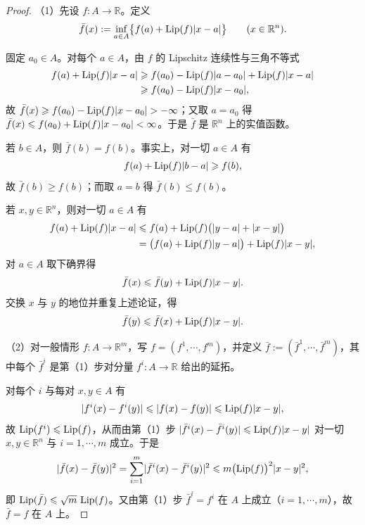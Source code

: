 \documentclass[../../main.tex]{subfiles}%
\begin{document}
\begin{proof}
（1）先设 $f:A\to\mathbb{R}$。定义
\begin{align*}
\bar f(x):=\inf_{a\in A}\bigl\{f(a)+\operatorname{Lip}(f)\lvert x-a\rvert\bigr\}\qquad(x\in\mathbb{R}^n).
\end{align*}

固定 $a_0\in A$。对每个 $a\in A$，由 $f$ 的 Lipschitz 连续性与三角不等式
\begin{align*}
f(a)+\operatorname{Lip}(f)\lvert x-a\rvert
&\geqslant f(a_0)-\operatorname{Lip}(f)\lvert a-a_0\rvert+\operatorname{Lip}(f)\lvert x-a\rvert\\
&\geqslant f(a_0)-\operatorname{Lip}(f)\lvert x-a_0\rvert,
\end{align*}
故 $\bar f(x)\geqslant f(a_0)-\operatorname{Lip}(f)\lvert x-a_0\rvert>-\infty$；又取 $a=a_0$ 得 $\bar f(x)\leqslant f(a_0)+\operatorname{Lip}(f)\lvert x-a_0\rvert<\infty$。于是 $\bar f$ 是 $\mathbb{R}^n$ 上的实值函数。

若 $b\in A$，则 $\bar f(b)=f(b)$。事实上，对一切 $a\in A$ 有
\begin{align*}
f(a)+\operatorname{Lip}(f)\lvert b-a\rvert\geqslant f(b),
\end{align*}
故 $\bar f(b)\geqslant f(b)$；而取 $a=b$ 得 $\bar f(b)\leqslant f(b)$。

若 $x,y\in\mathbb{R}^n$，则对一切 $a\in A$ 有
\begin{align*}
f(a)+\operatorname{Lip}(f)\lvert x-a\rvert
&\leqslant f(a)+\operatorname{Lip}(f)\bigl(\lvert y-a\rvert+\lvert x-y\rvert\bigr)\\
&=\bigl(f(a)+\operatorname{Lip}(f)\lvert y-a\rvert\bigr)+\operatorname{Lip}(f)\lvert x-y\rvert,
\end{align*}
对 $a\in A$ 取下确界得
\begin{align*}
\bar f(x)\leqslant\bar f(y)+\operatorname{Lip}(f)\lvert x-y\rvert.
\end{align*}
交换 $x$ 与 $y$ 的地位并重复上述论证，得
\begin{align*}
\bar f(y)\leqslant\bar f(x)+\operatorname{Lip}(f)\lvert x-y\rvert.
\end{align*}

（2）对一般情形 $f:A\to\mathbb{R}^m$，写 $f=(f^1,\cdots,f^m)$，并定义 $\bar f:=(\bar f^1,\cdots,\bar f^m)$，其中每个 $\bar f^i$ 是第（1）步对分量 $f^i:A\to\mathbb{R}$ 给出的延拓。

对每个 $i$ 与每对 $x,y\in A$ 有
\begin{align*}
\lvert f^i(x)-f^i(y)\rvert\leqslant\lvert f(x)-f(y)\rvert\leqslant\operatorname{Lip}(f)\lvert x-y\rvert,
\end{align*}
故 $\operatorname{Lip}(f^i)\leqslant\operatorname{Lip}(f)$，从而由第（1）步 $\lvert\bar f^i(x)-\bar f^i(y)\rvert\leqslant\operatorname{Lip}(f)\lvert x-y\rvert$ 对一切 $x,y\in\mathbb{R}^n$ 与 $i=1,\cdots,m$ 成立。于是
\begin{align*}
\lvert\bar f(x)-\bar f(y)\rvert^2=\sum_{i=1}^m\lvert\bar f^i(x)-\bar f^i(y)\rvert^2\leqslant m\bigl(\operatorname{Lip}(f)\bigr)^2\lvert x-y\rvert^2,
\end{align*}
即 $\operatorname{Lip}(\bar f)\leqslant\sqrt{m}\,\operatorname{Lip}(f)$。又由第（1）步 $\bar f^i=f^i$ 在 $A$ 上成立（$i=1,\cdots,m$），故 $\bar f=f$ 在 $A$ 上。
\end{proof}
\end{document}
